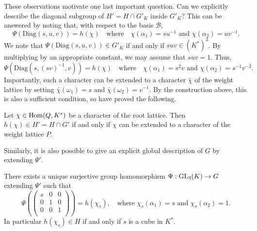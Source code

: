 These observations motivate one last important question. Can we explicitly describe the diagonal subgroup of $H'=H\cap G'_K$ inside $G'_K$? This can be answered by noting that, with respect to the basis $\mathcal{B}$,
$$\Psi(\mathrm{Diag}(s,u,v))=h(\chi) \quad\text{where}\quad \chi(\alpha_1)=su^{-1}\text{ and }\chi(\alpha_2)=uv^{-1}.$$
We note that $\Psi(\mathrm{Diag}(s,u,v))\in G'_K$ if and only if $suv\in (K^*)^3$. By multiplying by an appropriate constant, we may assume that $suv=1$. Thus, 
$$\Psi(\mathrm{Diag}(s,(sv)^{-1},v))=h(\chi) \quad\text{where}\quad \chi(\alpha_1)=s^2v\text{ and }\chi(\alpha_2)=s^{-1}v^{-2}.$$
Importantly, such a character can be extended to a character $\bar{\chi}$ of the weight lattice by setting $\bar\chi(\omega_1)=s$ and $\bar\chi(\omega_2)=v^{-1}$. By the construction above, this is also a sufficient condition, so have proved the following.

\begin{lemma}
    Let $\chi\in\mathrm{Hom}(Q,K^*)$ be a character of the root lattice. Then $h(\chi)\in H'=H\cap G'$ if and only if $\chi$ can be extended to a character of the weight lattice $P$.
\end{lemma}
\iffalse
Similarly, it is also possible to give an explicit global description of $G$ by extending $\Psi'$. 

\begin{theorem}
    There exists a unique surjective group homomorphism $\Psi:\mathrm{GL}_3(K)\to G$ extending $\Psi'$ such that 
    $$\Psi\left(\begin{pmatrix}
        s & 0 & 0\\
        0 & 1 & 0\\
        0 & 0 & 1\\
    \end{pmatrix}\right)=h(\chi_s),\quad\text{where }\chi_s(\alpha_1)=s\text{ and }\chi_s(\alpha_2)=1.$$
    In particular $h(\chi_s)\in H$ if and only if $s$ is a cube in $K^*$.
\end{theorem}

